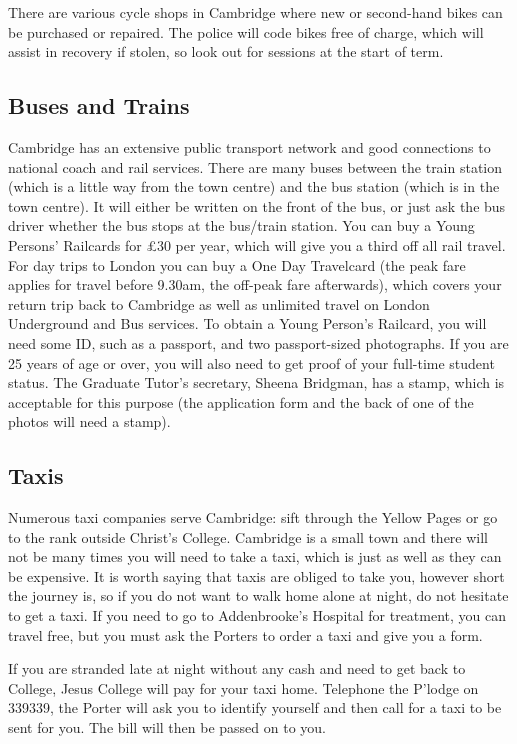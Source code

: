 \documentclass[11pt,fleqn, oneside]{book} %
\begin{document}
There are various cycle shops in Cambridge where new or second-hand bikes can be purchased or repaired. The police will code bikes free of charge, which will assist in recovery if stolen, so look out for sessions at the start of term. 
    
\subsection{Buses and Trains}
    
Cambridge has an extensive public transport network and good connections to national coach and rail services. There are many buses between the train station (which is a little way from the town centre) and the bus station (which is in the town centre).  It will either be written on the front of the bus, or just ask the bus driver whether the bus stops at the bus/train station. 
You can buy a Young Persons’ Railcards for £30 per year, which will give you a third off all rail travel. For day trips to London you can buy a One Day Travelcard (the peak fare applies for travel before 9.30am, the off-peak fare afterwards), which covers your return trip back to Cambridge as well as unlimited travel on London Underground and Bus services.
To obtain a Young Person’s Railcard, you will need some ID, such as a passport, and two passport-sized photographs. If you are 25 years of age or over, you will also need to get proof of your full-time student status. The Graduate Tutor’s secretary, Sheena Bridgman, has a stamp, which is acceptable for this purpose (the application form and the back of one of the photos will need a stamp). 
    
\subsection{Taxis}
    
Numerous taxi companies serve Cambridge: sift through the Yellow Pages or go to the rank outside Christ’s College.  Cambridge is a small town and there will not be many times you will need to take a taxi, which is just as well as they can be expensive.  It is worth saying that taxis are obliged to take you, however short the journey is, so if you do not want to walk home alone at night, do not hesitate to get a taxi.  If you need to go to Addenbrooke’s Hospital for treatment, you can travel free, but you must ask the Porters to order a taxi and give you a form. 
    
If you are stranded late at night without any cash and need to get back to College, Jesus College will pay for your taxi home. Telephone the P’lodge on 339339, the Porter will ask you to identify yourself and then call for a taxi to be sent for you. The bill will then be passed on to you. 
    
\end{document}
